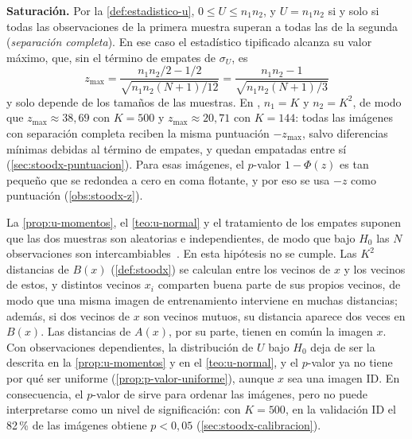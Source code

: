 \begin{observacion}
\textbf{Saturación.} Por la \cref{def:estadistico-u}, $0 \le U \le n_1 n_2$, y $U = n_1 n_2$ si y solo si todas las observaciones de la primera muestra superan a todas las de la segunda (\emph{separación completa}). En ese caso el estadístico tipificado alcanza su valor máximo, que, sin el término de empates de $\sigma_U$, es
\[
  z_{\max} = \frac{n_1 n_2/2 - 1/2}{\sqrt{n_1 n_2 (N + 1)/12}} = \frac{n_1 n_2 - 1}{\sqrt{n_1 n_2 (N + 1)/3}}
\]
y solo depende de los tamaños de las muestras. En \stoodx, $n_1 = K$ y $n_2 = K^2$, de modo que $z_{\max} \approx 38{,}69$ con $K = 500$ y $z_{\max} \approx 20{,}71$ con $K = 144$: todas las imágenes con separación completa reciben la misma puntuación $-z_{\max}$, salvo diferencias mínimas debidas al término de empates, y quedan empatadas entre sí (\cref{sec:stoodx-puntuacion}). Para esas imágenes, el $p$-valor $1 - \Phi(z)$ es tan pequeño que se redondea a cero en coma flotante, y por eso se usa $-z$ como puntuación (\cref{obs:stoodx-z}).
\end{observacion}

\begin{observacion}\label{obs:u-dependencia}
La \cref{prop:u-momentos}, el \cref{teo:u-normal} y el tratamiento de los empates suponen que las dos muestras son aleatorias e independientes, de modo que bajo $H_0$ las $N$ observaciones son intercambiables~\cite[sec.~15.2]{canavos2003}. En \stoodx esta hipótesis no se cumple. Las $K^2$ distancias de $B(x)$ (\cref{def:stoodx}) se calculan entre los vecinos de $x$ y los vecinos de estos, y distintos vecinos $x_i$ comparten buena parte de sus propios vecinos, de modo que una misma imagen de entrenamiento interviene en muchas distancias; además, si dos vecinos de $x$ son vecinos mutuos, su distancia aparece dos veces en $B(x)$. Las distancias de $A(x)$, por su parte, tienen en común la imagen $x$. Con observaciones dependientes, la distribución de $U$ bajo $H_0$ deja de ser la descrita en la \cref{prop:u-momentos} y en el \cref{teo:u-normal}, y el $p$-valor ya no tiene por qué ser uniforme (\cref{prop:p-valor-uniforme}), aunque $x$ sea una imagen ID. En consecuencia, el $p$-valor de \stoodx sirve para ordenar las imágenes, pero no puede interpretarse como un nivel de significación: con $K = 500$, en la validación ID el 82\,\% de las imágenes obtiene $p < 0{,}05$ (\cref{sec:stoodx-calibracion}).
\end{observacion}

